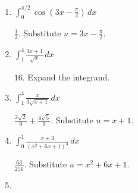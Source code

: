 \documentclass{article}
\begin{document}
\begin{enumerate}
\begin{enumerate}
  \begin{solution}
    $\displaystyle - \frac{1}{2} \cos (4\pi - 4)+ \frac{1}{2} \cos (- 4)$.  Substitute $u = 2x -
    4$. 
  \end{solution}
  \probonly{\vfill}


\item

  \begin{problem}
    $\displaystyle \int_0^{\pi/2} \cos \left(3x - \frac{\pi}{2}
    \right)\,dx$ 
  \end{problem}

  \begin{solution}
    $\displaystyle \frac{1}{3}$.  Substitute $u = 3x - \frac{\pi}{2}$. 
  \end{solution}
  \probonly{\vfill}

  \probonly{\newpage}

\item

  \begin{problem}
    $\displaystyle \int_1^4 \frac{3x+1}{\sqrt{x}}\, dx$
  \end{problem}

  \begin{solution}
    $16$.  Expand the integrand. 
  \end{solution}
  \probonly{\vfill}

\item

  \begin{problem}
    $\displaystyle \int_1^{4} \frac{x}{3 \sqrt{x+1}} \, dx $
  \end{problem}

  \begin{solution}
    $\displaystyle \frac{2 \sqrt{2}}{9} + \frac{4 \sqrt{5}}{9}$.
    Substitute $u = x + 1$. 
  \end{solution}
  \probonly{\vfill}

\item

  \begin{problem}
    $\displaystyle \int_{0}^1 \frac{x+3}{(x^2 + 6x + 1)^3} \,dx$
  \end{problem}

  \begin{solution}
    $\displaystyle \frac{63}{256}$.  Substitute $u = x^2 + 6x + 1$. 
  \end{solution}
  \probonly{\vfill}

\item


\end{enumerate}
\end{enumerate}
\end{document}
